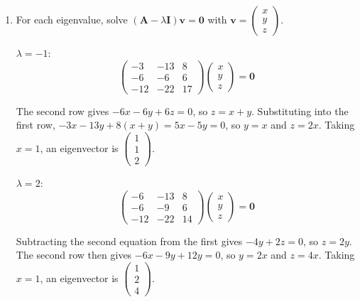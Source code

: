 \documentclass[leqno]{article}
\begin{document}
\begin{enumerate}[
  label=\textbf{\arabic*.},
  leftmargin=*,
  topsep=0pt,
  partopsep=0pt,
  parsep=0pt
]
\begin{djsSolution}
\begin{enumerate}[label=\textbf{(\alph*)}, start=1]
Setting this equal to zero and multiplying by \(-1\), the characteristic equation is
\[
\lambda^3-5\lambda^2+2\lambda+8=0
\]

as required.

Substituting \(\lambda=-1\) gives \(-1-5-2+8=0\), so \((\lambda+1)\) is a factor:
\[
(\lambda+1)(\lambda^2-6\lambda+8)=(\lambda+1)(\lambda-2)(\lambda-4)=0
\]

The eigenvalues are therefore
\[
\lambda=-1,\qquad \lambda=2,\qquad \lambda=4
\]

  \item For each eigenvalue, solve \((\mathbf{A}-\lambda\mathbf{I})\mathbf{v}=\mathbf{0}\) with \(\mathbf{v}=\begin{pmatrix}x\\y\\z\end{pmatrix}\).

\(\lambda=-1\):
\[
\begin{pmatrix} -3 & -13 & 8 \\ -6 & -6 & 6 \\ -12 & -22 & 17 \end{pmatrix}\begin{pmatrix}x\\y\\z\end{pmatrix}=\mathbf{0}
\]

The second row gives \(-6x-6y+6z=0\), so \(z=x+y\). Substituting into the first row, \(-3x-13y+8(x+y)=5x-5y=0\), so \(y=x\) and \(z=2x\). Taking \(x=1\), an eigenvector is \(\begin{pmatrix}1\\1\\2\end{pmatrix}\).

\(\lambda=2\):
\[
\begin{pmatrix} -6 & -13 & 8 \\ -6 & -9 & 6 \\ -12 & -22 & 14 \end{pmatrix}\begin{pmatrix}x\\y\\z\end{pmatrix}=\mathbf{0}
\]

Subtracting the second equation from the first gives \(-4y+2z=0\), so \(z=2y\). The second row then gives \(-6x-9y+12y=0\), so \(y=2x\) and \(z=4x\). Taking \(x=1\), an eigenvector is \(\begin{pmatrix}1\\2\\4\end{pmatrix}\).


\end{enumerate}
\end{djsSolution}
\end{enumerate}
\end{document}
